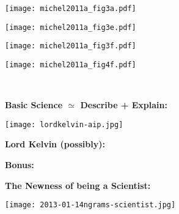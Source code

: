   
\begin{marginfigure}[]
\texttt{[image: michel2011a\_fig3a.pdf]} 
\end{marginfigure}

  
\begin{marginfigure}[]
\texttt{[image: michel2011a\_fig3e.pdf]} \\
\end{marginfigure}

  
\begin{marginfigure}[]
\texttt{[image: michel2011a\_fig3f.pdf]}
\end{marginfigure}

  
\begin{marginfigure}[]
\texttt{[image: michel2011a\_fig4f.pdf]}
\end{marginfigure}


  {\small
    \\
  }



  \textbf{Basic Science $\simeq$ Describe + Explain:}

      
    
\begin{marginfigure}[]
\texttt{[image: lordkelvin-aip.jpg]}
\end{marginfigure}

    
    \textbf{Lord Kelvin (possibly):}
      
      
       
      
    
    \textbf{Bonus:}
      
      
      
      
    

  


  \textbf{The Newness of being a Scientist:}

  
\begin{marginfigure}[]
\texttt{[image: 2013-01-14ngrams-scientist.jpg]}
\end{marginfigure}




